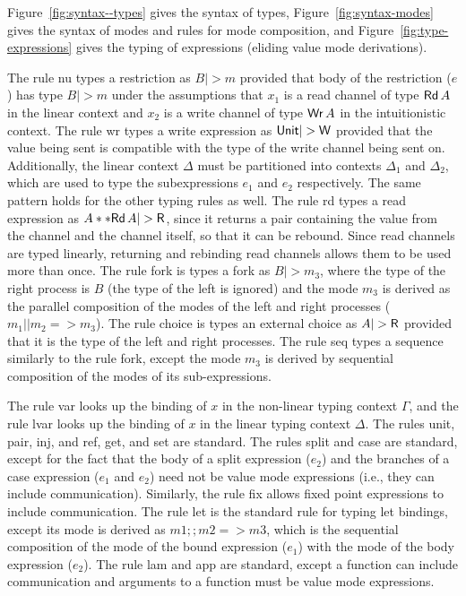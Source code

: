 \noindent Figure~\ref{fig:syntax--types} gives the syntax of types,
Figure~\ref{fig:syntax-modes} gives the syntax of modes and rules for mode
composition, and Figure~\ref{fig:type-expressions} gives the typing of
expressions (eliding value mode derivations).

 The rule nu types a restriction as
$B |> m$ provided that body of the restriction ($e$) has type $B |> m$ under the
assumptions that $x_1$ is a read channel of type $\text{\textsf{Rd}}\,A$ in the linear
context and $x_2$ is a write channel of type $\text{\textsf{Wr}}\,A$ in the intuitionistic
context. The rule wr types a write expression as $\tyUnit |> \Wm$ provided that
the value being sent is compatible with the type of the write channel being sent
on. Additionally, the linear context $\Delta$ must be partitioned into contexts $\Delta_1$
and $\Delta_2$, which are used to type the subexpressions $e_1$ and $e_2$
respectively. The same pattern holds for the other typing rules as well. The rule rd types a read expression as $\tyProd{A}{\tyRd{A}} |> \Rm$, since it
returns a pair containing the value from the channel and the channel itself, so
that it can be rebound. Since read channels are typed linearly, returning and
rebinding read channels allows them to be used more than once. The rule fork is
types a fork as $B |> m_3$, where the type of the right process is $B$ (the type
of the left is ignored) and the mode $m_3$ is derived as the parallel
composition of the modes of the left and right processes ($m_1 || m_2 =>
m_3$). The rule choice is types an external choice as $A |> \Rm$ provided that
it is the type of the left and right processes. The rule seq types a sequence
similarly to the rule fork, except the mode $m_3$ is derived by sequential
composition of the modes of its sub-expressions.

The rule var looks up the binding of $x$ in the non-linear typing context $\Gamma$,
and the rule lvar looks up the binding of $x$ in the linear typing context
$\Delta$. The rules unit, pair, inj, and ref, get, and set are standard. The rules
split and case are standard, except for the fact that the body of a
\textsf{split} expression ($e_2$) and the branches of a \textsf{case} expression
($e_1$ and $e_2$) need not be value mode expressions (i.e., they can include
communication). Similarly, the rule fix allows fixed point expressions to
include communication. The rule let is the standard rule for typing let
bindings, except its mode is derived as $m1 ;; m2 => m3$, which is the
sequential composition of the mode of the bound expression ($e_1$) with the mode
of the body expression ($e_2$). The rule lam and app are standard, except a
function can include communication and arguments to a function must be value
mode expressions.

